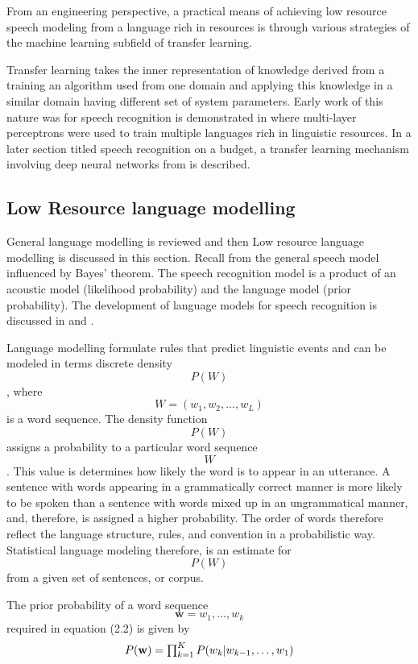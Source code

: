 From an engineering perspective, a practical means of achieving low resource speech modeling from a language rich in resources is through various strategies of the machine learning subfield of transfer learning.  

Transfer learning takes the inner representation of knowledge derived from a training an algorithm used from one domain and applying this knowledge in a similar domain having different set of system parameters. Early work of this nature was for speech recognition is demonstrated in \citep{vu2013multilingual} where multi-layer perceptrons were used to train multiple languages rich in linguistic resources. In a later section titled speech recognition on a budget, a transfer learning mechanism involving deep neural networks from \citep{kunze2017transfer} is described.

\subsection{Low Resource language modelling} \label{sec_lrlm}

General language modelling is reviewed and then Low resource language modelling is discussed in this section. Recall from the general speech model influenced by Bayes' theorem.  The speech recognition model is a product of an acoustic model (likelihood probability) and the language model (prior probability).  The development of  language models for speech recognition is discussed in \cite{juang2000} and \cite{young1996}. 

Language modelling formulate rules that predict linguistic events and can be modeled in terms discrete density $$P(W)$$, where  $$W=(w_1, w_2,..., w_L)$$ is a word sequence. The density function $$P(W)$$ assigns a probability to a particular word sequence $$W$$.  This value is determines how likely the word is to appear in an utterance. A sentence with words appearing in a grammatically correct manner is more likely to be spoken than a sentence with words mixed up in an ungrammatical manner, and, therefore, is assigned a higher probability. The order of words therefore reflect the language structure, rules, and convention in a probabilistic way. Statistical language modeling therefore, is an estimate for $$P(W)$$ from a given set of sentences, or corpus.

The prior probability of a word sequence $$\mathbf{w}=w_1,\dots,w_k$$ required in equation (2.2) is given by
\begin{equation}$$P(\mathbf{w})=\prod_{k=1}^KP(w_k|w_{k-1},\dots,w_1)$$
\label{eqn_c2_lm01}
\end{equation}

